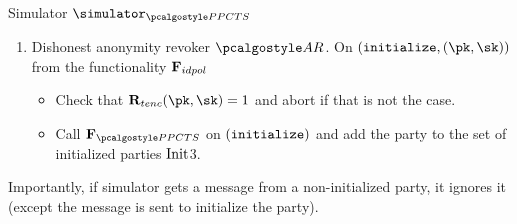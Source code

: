 \documentclass[runningheads,10pt]{llncs}
\numberwithin{equation}{section}
\begin{document}
\begin{simbox}{Simulator $\simulator_{\PPCTS}$}
\begin{enumerate}
  \item Dishonest anonymity revoker $\ar$. On $(\initialize, (\pk, \sk))$ from the
    functionality $\mathbf{F}_{{idpol}}$
    \begin{itemize}
    \item Check that $\REL_{tenc} (\pk, \sk) = 1$ and abort if that is not the case.
    \item Call $\func{\PPCTS}$ on $(\mathtt{initialize})$ and add the party to the set of
      initialized parties $\mathrm{Init}$3.
    \end{itemize}
  \end{enumerate}

  Importantly, if simulator gets a message from a non-initialized party, it ignores
  it (except the message is sent to initialize the party). 


\end{simbox}
\end{document}
